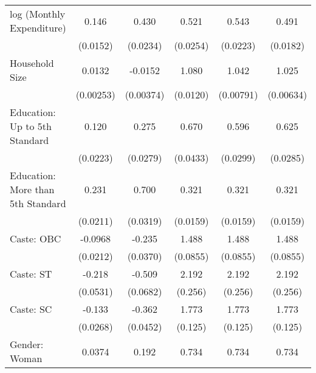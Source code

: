 {\begin{tabular}{l*{5}{c}}
\hline
log (Monthly Expenditure)&       0.146\sym{***}&       0.430\sym{***}&        0.521\sym{***}&       0.543\sym{***}&       0.491\sym{***}\\
                    &    (0.0152)         &    (0.0234)        &    (0.0254)         &    (0.0223)         &    (0.0182)         \\
[1em]
Household Size       &       0.0132\sym{***}&     -0.0152\sym{***}&       1.080\sym{***}&       1.042\sym{***}&       1.025\sym{***}\\
                    &    (0.00253)         &   (0.00374)        &    (0.0120)         &   (0.00791)         &   (0.00634)         \\
[1em]
Education: Up to 5th Standard          &       0.120\sym{***}&       0.275\sym{***}&              0.670\sym{***}&       0.596\sym{***}&       0.625\sym{***}\\
                    &    (0.0223)         &    (0.0279)            &    (0.0433)         &    (0.0299)         &    (0.0285)         \\
[1em]                    
Education: More than 5th Standard         &        0.231\sym{***}&       0.700\sym{***}&      0.321\sym{***}&       0.321\sym{***}&       0.321\sym{***}\\
                    &    (0.0211)         &    (0.0319)       &    (0.0159)         &    (0.0159)         &    (0.0159)         \\
[1em]
Caste: OBC             &     -0.0968\sym{***}&      -0.235\sym{***}&              1.488\sym{***}&       1.488\sym{***}&       1.488\sym{***}\\
                    &    (0.0212)         &    (0.0370)         &     (0.0855)         &    (0.0855)         &    (0.0855)         \\
[1em]
Caste: ST            &      -0.218\sym{***}&      -0.509\sym{***} &     2.192\sym{***}&       2.192\sym{***}&       2.192\sym{***}\\
                    &    (0.0531)         &    (0.0682)         &   (0.256)         &     (0.256)         &     (0.256)         \\
[1em]
Caste: SC             &      -0.133\sym{***}&      -0.362\sym{***}&    1.773\sym{***}&       1.773\sym{***}&       1.773\sym{***}\\
                    &    (0.0268)         &    (0.0452)         &     (0.125)         &     (0.125)         &     (0.125)         \\                 
[1em]
Gender: Woman   &      0.0374         &       0.192\sym{***} &       0.734\sym{***}&       0.734\sym{***}&       0.734\sym{***}\\

\end{tabular}}
